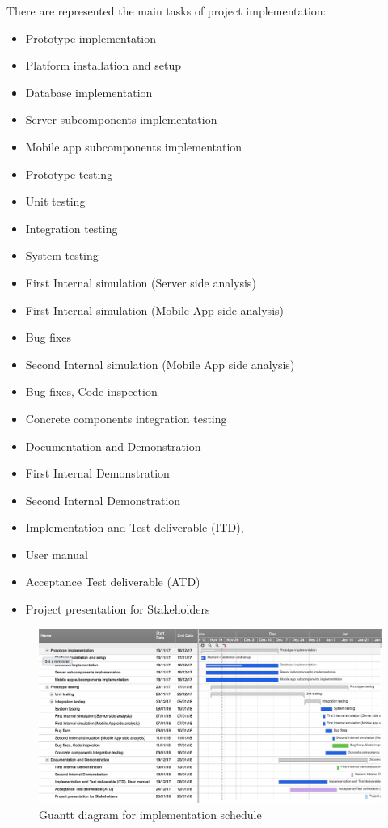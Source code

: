 \documentclass[a4paper,leqno]{article}
\begin{document}
There are represented the main tasks of project implementation:
\begin{itemize}
	\item Prototype implementation
	\item Platform installation and setup
	\item Database implementation
	\item Server subcomponents implementation
	\item Mobile app subcomponents implementation
	\item Prototype testing
	\item Unit testing
	\item Integration testing
	\item System testing
	\item First Internal simulation (Server side analysis)
	\item First Internal simulation (Mobile App side analysis)
	\item Bug fixes
	\item Second Internal simulation (Mobile App side analysis)
	\item Bug fixes, Code inspection
	\item Concrete components integration testing
	\item Documentation and Demonstration
	\item First Internal Demonstration
	\item Second Internal Demonstration
	\item Implementation and Test deliverable (ITD), \item User manual
	\item Acceptance Test deliverable (ATD)
	\item Project presentation for Stakeholders
	
\end{itemize}

\begin{figure}[!h]
	\begin{centering}
		\includegraphics[scale=0.3]{Guantt_diagram_25112017_1}
	\end{centering}
	\caption{Guantt diagram for implementation schedule}
\end{figure}
\end{document}
